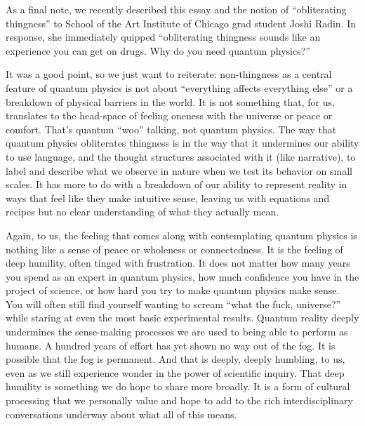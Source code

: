 \documentclass[onecolumn,preprintnumbers,amsmath,amssymbn,reprint,nofootinbib,superscriptaddress]{revtex4}    %
\begin{document}


As a final note, we recently described this essay and the notion of ``obliterating thingness'' to School of the Art Institute of Chicago grad student Joshi Radin.  In response, she immediately quipped ``obliterating thingness sounds like an experience you can get on drugs. Why do you need quantum physics?''

It was a good point, so we just want to reiterate: non-thingness as a central feature of quantum physics is not about ``everything affects everything else'' or a breakdown of physical barriers in the world.  It is not something that, for us, translates to the head-space of feeling oneness with the universe or peace or comfort.  That's quantum ``woo'' talking, not quantum physics.  The way that quantum physics obliterates thingness is in the way that it undermines our ability to use language, and the thought structures associated with it (like narrative), to label and describe what we observe in nature when we test its behavior on small scales. It has more to do with a breakdown of our ability to represent reality in ways that feel like they make intuitive sense, leaving us with equations and recipes but no clear understanding of what they actually mean.  

Again, to us, the feeling that comes along with contemplating quantum physics is nothing like a sense of peace or wholeness or connectedness.  It is the feeling of deep humility, often tinged with frustration.  It does not matter how many years you spend as an expert in quantum physics, how much confidence you have in the project of science, or how hard you try to make quantum physics make sense.  You will often still find yourself wanting to scream ``what the fuck, universe?'' while staring at even the most basic experimental results.  Quantum reality deeply undermines the sense-making processes we are used to being able to perform as humans. A hundred years of effort has yet shown no way out of the fog.  It is possible that the fog is permanent. And that is deeply, deeply humbling, to us, even as we still experience wonder in the power of scientific inquiry.  That deep humility is something we do hope to share more broadly.  It is a form of cultural processing that we personally value and hope to add to the rich interdisciplinary conversations underway about what all of this means.  
\end{document}
